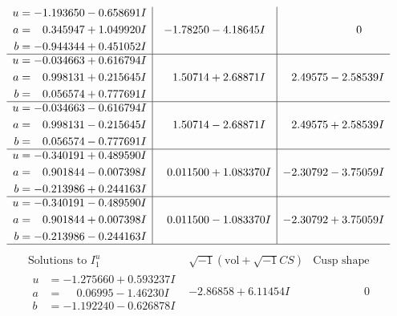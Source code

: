 \documentclass[1p]{elsarticle_modified}
\theoremstyle{definition}
\newcommand{\I}{\sqrt{-1}}
\begin{document}
$$\begin{array}{c|c|c}
\begin{aligned}
u &= -1.193650 - 0.658691 I \\
a &= \phantom{-}0.345947 + 1.049920 I \\
b &= -0.944344 + 0.451052 I\end{aligned}
 & -1.78250 - 4.18645 I & \phantom{-0.000000 } 0 \\ \hline\begin{aligned}
u &= -0.034663 + 0.616794 I \\
a &= \phantom{-}0.998131 + 0.215645 I \\
b &= \phantom{-}0.056574 + 0.777691 I\end{aligned}
 & \phantom{-}1.50714 + 2.68871 I & \phantom{-}2.49575 - 2.58539 I \\ \hline\begin{aligned}
u &= -0.034663 - 0.616794 I \\
a &= \phantom{-}0.998131 - 0.215645 I \\
b &= \phantom{-}0.056574 - 0.777691 I\end{aligned}
 & \phantom{-}1.50714 - 2.68871 I & \phantom{-}2.49575 + 2.58539 I \\ \hline\begin{aligned}
u &= -0.340191 + 0.489590 I \\
a &= \phantom{-}0.901844 - 0.007398 I \\
b &= -0.213986 + 0.244163 I\end{aligned}
 & \phantom{-}0.011500 + 1.083370 I & -2.30792 - 3.75059 I \\ \hline\begin{aligned}
u &= -0.340191 - 0.489590 I \\
a &= \phantom{-}0.901844 + 0.007398 I \\
b &= -0.213986 - 0.244163 I\end{aligned}
 & \phantom{-}0.011500 - 1.083370 I & -2.30792 + 3.75059 I\\
 \hline 
 \end{array}$$\newpage$$\begin{array}{c|c|c}  
\text{Solutions to }I^u_{1}& \I (\text{vol} + \sqrt{-1}CS) & \text{Cusp shape}\\
 \hline 
\begin{aligned}
u &= -1.275660 + 0.593237 I \\
a &= \phantom{-}0.06995 - 1.46230 I \\
b &= -1.192240 - 0.626878 I\end{aligned}
 & -2.86858 + 6.11454 I & \phantom{-0.000000 } 0 \\ \hline\begin{aligned}

\end{aligned}
\end{array}$$
\end{document}
